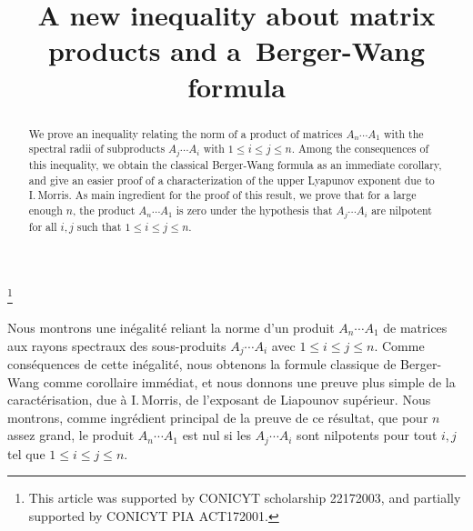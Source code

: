 \documentclass[JEP,XML,SOM,Unicode,NoEqCountersInSection]{cedram}
\theoremstyle{plain}
\theoremstyle{definition}
\begin{document}
\frontmatter
\title{A new inequality about matrix products and a~Berger-Wang formula}

\author[\initial{E.} \lastname{Oregón-Reyes}]{ }
\address{Department of Mathematics, University of California at Berkeley\\
848 Evans Hall, Berkeley, CA 94720-3860, U.S.A.}

\thanks{This article was supported by CONICYT scholarship 22172003, and partially supported by CONICYT PIA ACT172001.}

\begin{abstract}
We prove an inequality relating the norm of a product of matrices $A_n\cdots A_1$ with the spectral radii of subproducts $A_j\cdots A_i$ with $1\leq i\leq j\leq n$. Among the consequences of this inequality, we obtain the classical Berger-Wang formula as an immediate corollary, and give an easier proof of a characterization of the upper Lyapunov exponent due to I.\,Morris. As main ingredient for the proof of this result, we prove that for a large enough $n$, the product $A_n\cdots A_1$ is zero under the hypothesis that $A_j\cdots A_i$ are nilpotent for all $i,j$ such that $1\leq i \leq j\leq n$.
\end{abstract}





\begin{altabstract}
Nous montrons une inégalité reliant la norme d'un produit $A_n\cdots A_1$ de matrices aux rayons spectraux des sous-produits $A_j\cdots A_i$ avec $1\leq i\leq j\leq n$. Comme conséquences de cette inégalité, nous obtenons la formule classique de Berger-Wang comme corollaire immédiat, et nous donnons une preuve plus simple de la caractérisation, due à I.\,Morris, de l'exposant de Liapounov supérieur. Nous montrons, comme ingrédient principal de la preuve de ce résultat, que pour $n$ assez grand, le produit $A_n\cdots A_1$ est nul si les $A_j\cdots A_i$ sont nilpotents pour tout $i,j$ tel que $1\leq i \leq j\leq n$.
\end{altabstract}
\end{document}
